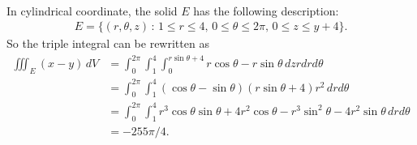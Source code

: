 	\\
	In cylindrical coordinate, the solid $E$ has the following description:
		\begin{align*}
		E = \{ (r, \theta , z) \, : \, 1 \leq r \leq 4 , \, 0 \leq \theta \leq 2\pi , \, 0 \leq z \leq y + 4 \} .
		\end{align*}
	So the triple integral can be rewritten as
		\begin{align*}
		\iiint_E (x - y) \, dV &= \int_0^{2\pi} \int_1^4 \int_0^{r \sin \theta +4} r \cos \theta - r \sin \theta \, dz r dr d \theta \\
		&= \int_0^{2\pi} \int_1^4 (\cos \theta - \sin \theta) (r \sin \theta + 4 ) r^2 \, dr d\theta \\
		&= \int_0^{2\pi} \int_1^4 r^3 \cos \theta \sin \theta + 4r^2 \cos \theta - r^3 \sin^2 \theta - 4 r^2 \sin \theta \, dr d\theta \\
		&= -255 \pi/4 .
		\end{align*}


